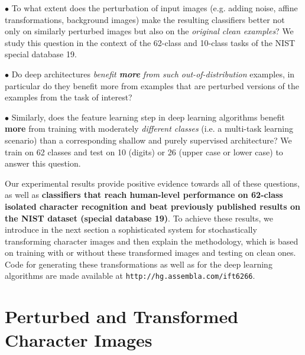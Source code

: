 \documentclass{article} %
\begin{document}
$\bullet$ %
To what extent does the perturbation of input images (e.g. adding
noise, affine transformations, background images) make the resulting
classifiers better not only on similarly perturbed images but also on
the {\em original clean examples}? We study this question in the
context of the 62-class and 10-class tasks of the NIST special database 19.

$\bullet$ %
Do deep architectures {\em benefit {\bf more} from such out-of-distribution}
examples, in particular do they benefit more from 
examples that are perturbed versions of the examples from the task of interest?

$\bullet$ %
Similarly, does the feature learning step in deep learning algorithms benefit {\bf more}
from training with moderately {\em different classes} (i.e. a multi-task learning scenario) than
a corresponding shallow and purely supervised architecture?
We train on 62 classes and test on 10 (digits) or 26 (upper case or lower case)
to answer this question.

Our experimental results provide positive evidence towards all of these questions,
as well as {\bf classifiers that reach human-level performance on 62-class isolated character
recognition and beat previously published results on the NIST dataset (special database 19)}.
To achieve these results, we introduce in the next section a sophisticated system
for stochastically transforming character images and then explain the methodology,
which is based on training with or without these transformed images and testing on 
clean ones. 
Code for generating these transformations as well as for the deep learning 
algorithms are made available at {\tt http://hg.assembla.com/ift6266}.

\vspace*{-3mm}
\section{Perturbed and Transformed Character Images}
\label{s:perturbations}
\vspace*{-2mm}
\end{document}
